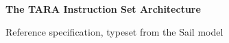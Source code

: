 \documentclass[a4paper,10pt]{article}
\begin{document}
\thispagestyle{plain}

\begin{center}
  {\LARGE\bfseries The TARA Instruction Set Architecture\par}
  \medskip
  {\large Reference specification, typeset from the Sail model\par}
\end{center}

{\hypersetup{linkcolor=black}\setlength{\parskip}{0pt}\tableofcontents}
\bigskip


\end{document}
